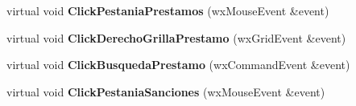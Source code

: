 \begin{DoxyCompactItemize}
\item 
virtual void {\bfseries Click\+Pestania\+Prestamos} (wx\+Mouse\+Event \&event)\hypertarget{class_ventana_principal_ac0833257e62cfac7d74a95450f45e7a0}{}\label{class_ventana_principal_ac0833257e62cfac7d74a95450f45e7a0}

\item 
virtual void {\bfseries Click\+Derecho\+Grilla\+Prestamo} (wx\+Grid\+Event \&event)\hypertarget{class_ventana_principal_a8f32970e70d10ba4c73a70b8bb5f8bbb}{}\label{class_ventana_principal_a8f32970e70d10ba4c73a70b8bb5f8bbb}

\item 
virtual void {\bfseries Click\+Busqueda\+Prestamo} (wx\+Command\+Event \&event)\hypertarget{class_ventana_principal_afd74ce768966f8b29797a7c25bc32ca9}{}\label{class_ventana_principal_afd74ce768966f8b29797a7c25bc32ca9}

\item 
virtual void {\bfseries Click\+Pestania\+Sanciones} (wx\+Mouse\+Event \&event)\hypertarget{class_ventana_principal_a54555224258636f89fd277cd83952975}{}\label{class_ventana_principal_a54555224258636f89fd277cd83952975}

\end{DoxyCompactItemize}
